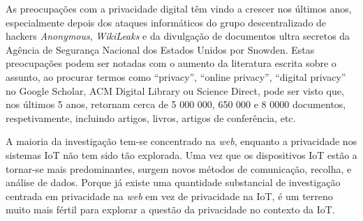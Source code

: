 \documentclass[conference]{IEEEtran}
\begin{document}

As preocupações com a privacidade digital têm vindo a crescer \cite{emami2019exploring, park2022personal, zhang2022peer}
nos últimos anos, especialmente depois dos ataques informáticos do grupo
descentralizado de hackers \textit{Anonymous}, \textit{WikiLeaks} e da divulgação
de documentos ultra secretos da Agência de Segurança Nacional dos Estados
Unidos por Snowden. Estas preocupações podem ser notadas com o aumento da
literatura escrita sobre o assunto, ao procurar termos como ``privacy'',
``online privacy'', ``digital privacy'' no Google Scholar, ACM Digital Library
ou Science Direct, pode ser visto que, nos últimos 5 anos, retornam cerca
de 5 000 000, 650 000 e 8 0000 documentos, respetivamente, incluindo artigos,
livros, artigos de conferência, etc.


A maioria da investigação tem-se concentrado na \textit{web}, enquanto a
privacidade nos sistemas IoT não tem sido tão explorada. Uma vez que os
dispositivos IoT estão a tornar-se mais predominantes, surgem novos métodos
de comunicação, recolha, e análise de dados. Porque já existe uma quantidade
substancial de investigação centrada em privacidade na \textit{web} em vez de
privacidade na IoT, é um terreno muito mais fértil para explorar a questão
da privacidade no contexto da IoT.
\end{document}
